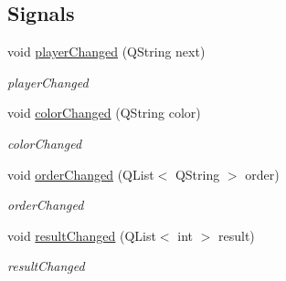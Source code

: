 \subsection*{Signals}
\begin{DoxyCompactItemize}
\item 
void \mbox{\hyperlink{class_my_gl_item_a93137c1e883f74e699e3dd164cd1cd43}{player\+Changed}} (Q\+String next)
\begin{DoxyCompactList}\small\item\em player\+Changed \end{DoxyCompactList}\item 
void \mbox{\hyperlink{class_my_gl_item_a7bab02e6f11d653e97b328a953d81c82}{color\+Changed}} (Q\+String color)
\begin{DoxyCompactList}\small\item\em color\+Changed \end{DoxyCompactList}\item 
void \mbox{\hyperlink{class_my_gl_item_a84b6d3045448453a2aaa40703448e132}{order\+Changed}} (Q\+List$<$ Q\+String $>$ order)
\begin{DoxyCompactList}\small\item\em order\+Changed \end{DoxyCompactList}\item 
void \mbox{\hyperlink{class_my_gl_item_a5b6e041f52d5d97782584b099596b5f5}{result\+Changed}} (Q\+List$<$ int $>$ result)
\begin{DoxyCompactList}\small\item\em result\+Changed \end{DoxyCompactList}\end{DoxyCompactItemize}
